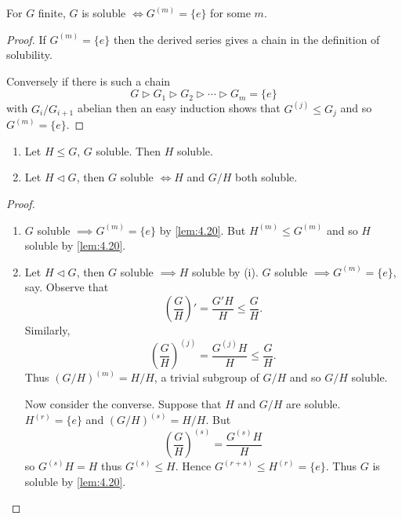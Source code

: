 \documentclass{article}
\begin{document}
\begin{nlemma}\label{lem:4.20}
    For $G$ finite, $G$ is soluble $\iff G^{(m)} = \{e\}$ for some $m$.
\end{nlemma}
\begin{proof}
    If $G^{(m)} = \{e\}$ then the derived series gives a chain in the definition of solubility.

    Conversely if there is such a chain
    \begin{equation*}
        G \rhd G_1 \rhd G_2 \rhd \dotsb \rhd G_m = \{e\}
    \end{equation*}
    with $G_i/G_{i+1}$ abelian then an easy induction shows that $G^{(j)} \leq G_j$ and so $G^{(m)} = \{e\}$.
\end{proof}
\begin{nlemma}\label{lem:4.21}\leavevmode
    \begin{enumerate}[label=(\roman*)]
        \item Let $H \leq G$, $G$ soluble. Then $H$ soluble.
        \item Let $H \lhd G$, then $G$ soluble $\iff H$ and $G/H$ both soluble.
    \end{enumerate}
\end{nlemma}
\begin{proof}\leavevmode
    \begin{enumerate}[label=(\roman*)]
        \item $G$ soluble $\implies G^{(m)} = \{e\}$ by \cref{lem:4.20}.
            But $H^{(m)} \leq G^{(m)}$ and so $H$ soluble by \cref{lem:4.20}.
        \item Let $H \lhd G$, then $G$ soluble $\implies H$ soluble by (i).
            $G$ soluble $\implies G^{(m)} = \{e\}$, say.
            Observe that
            \begin{equation*}\left(\frac{G}{H}\right)' = \frac{G'H}{H} \leq \frac{G}{H}.\end{equation*}
            Similarly,
            \begin{equation*}
                (\frac{G}{H})^{(j)} = \frac{G^{(j)}H}{H} \leq \frac{G}{H}.
            \end{equation*}
            Thus $(G/H)^{(m)} = H/H$, a trivial subgroup of $G/H$ and so $G/H$ soluble.

            Now consider the converse. Suppose that $H$ and $G/H$ are soluble.
            $H^({r}) = \{e\}$ and $(G/H)^{(s)} = H/H$.
            But
            \begin{equation*}
                \left(\frac{G}{H}\right)^{(s)} = \frac{G^{(s)}H}{H}
            \end{equation*}
            so $G^{(s)}H = H$ thus $G^{(s)} \leq H$. Hence $G^{(r+s)} \leq H^{(r)} = \{e\}$.
            Thus $G$ is soluble by \cref{lem:4.20}.
    \end{enumerate}
\end{proof}
\end{document}
